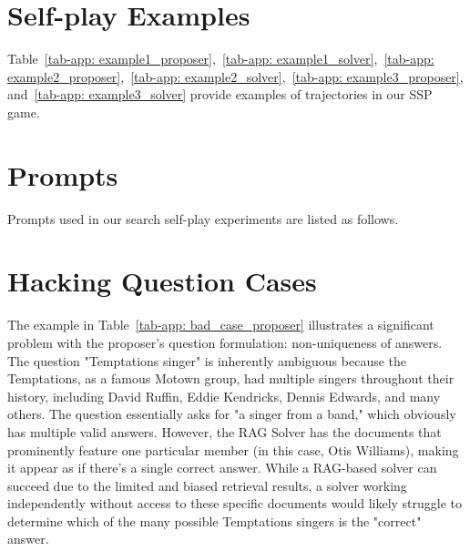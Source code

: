 \documentclass[10pt, a4paper, logo]{googledeepmind} %
\begin{document}



\section{Self-play Examples}

Table~\ref{tab-app: example1_proposer},~\ref{tab-app: example1_solver},~\ref{tab-app: example2_proposer},~\ref{tab-app: example2_solver},~\ref{tab-app: example3_proposer}, and~\ref{tab-app: example3_solver} provide examples of trajectories in our SSP game.



\section{Prompts}
\label{app:prompts}
Prompts used in our search self-play experiments are listed as follows.



\section{Hacking Question Cases}
\label{app:hacking_case}
The example in Table~\ref{tab-app: bad_case_proposer} illustrates a significant problem with the proposer's question formulation: non-uniqueness of answers. The question "Temptations singer" is inherently ambiguous because the Temptations, as a famous Motown group, had multiple singers throughout their history, including David Ruffin, Eddie Kendricks, Dennis Edwards, and many others. The question essentially asks for "a singer from a band," which obviously has multiple valid answers. However, the RAG Solver has the documents that prominently feature one particular member (in this case, Otis Williams), making it appear as if there's a single correct answer. While a RAG-based solver can succeed due to the limited and biased retrieval results, a solver working independently without access to these specific documents would likely struggle to determine which of the many possible Temptations singers is the "correct" answer. %


\end{document}
